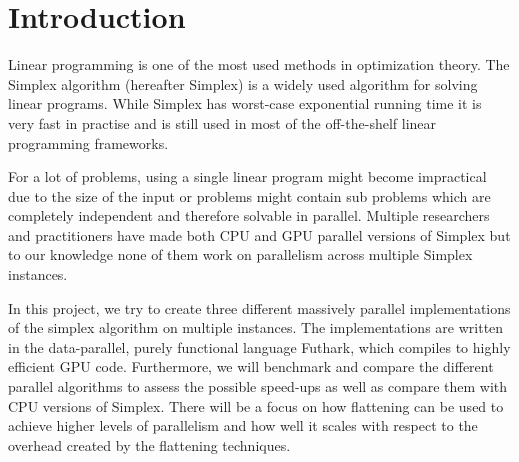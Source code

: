 \section{Introduction}
Linear programming is one of the most used methods in optimization theory. The Simplex algorithm (hereafter Simplex) is a widely used algorithm for solving linear programs. While Simplex has worst-case exponential running time it is very fast in practise and is still used in most of the off-the-shelf linear programming frameworks. 

For a lot of problems, using a single linear program might become impractical due to the size of the input or problems might contain sub problems which are completely independent and therefore solvable in parallel. Multiple researchers and practitioners have made both CPU and GPU parallel versions of Simplex but to our knowledge none of them work on parallelism across multiple Simplex instances.

\newpar In this project, we try to create three different massively parallel implementations of the simplex algorithm on multiple instances. The implementations are written in the data-parallel, purely functional language Futhark, which compiles to highly efficient GPU code. Furthermore, we will benchmark and compare the different parallel algorithms to assess the possible speed-ups as well as compare them with CPU versions of Simplex. There will be a focus on how flattening can be used to achieve higher levels of parallelism and how well it scales with respect to the overhead created by the flattening techniques.

